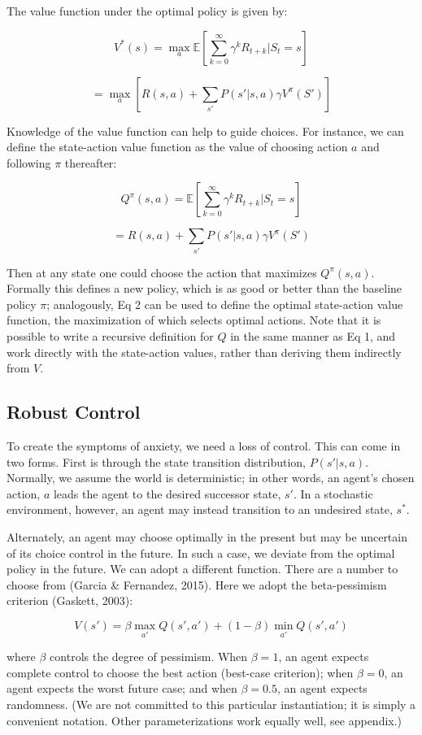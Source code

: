 \documentclass[11pt]{article} %
\begin{document}
The value function under the optimal policy is given by:

$$ V^*(s) = \max_a \mathbb{E} \left[ \sum^{\infty}_{k=0} \gamma^k R_{t+k} | S_t = s \right] $$

$$ = \max_a \left[ R(s,a) + \sum_{s'} P(s'|s,a) \gamma V^\pi (S') \right] $$

Knowledge of the value function can help to guide choices. For instance, we can
define the state-action value function as the value of choosing action $a$ and
following $\pi$ thereafter:

$$ Q^\pi(s,a) = \mathbb{E} \left[ \sum^{\infty}_{k=0} \gamma^k R_{t+k} | S_t = s \right] $$

$$ = R(s,a) + \sum_{s'} P(s'|s,a) \gamma V^\pi (S') $$

Then at any state one could choose the action that maximizes $Q^\pi(s,a)$. Formally
this defines a new policy, which is as good or better than the baseline policy
$\pi$; analogously, Eq 2 can be used to define the optimal state-action value
function, the maximization of which selects optimal actions. Note that it is
possible to write a recursive definition for $Q$ in the same manner as Eq 1, and
work directly with the state-action values, rather than deriving them indirectly
from $V$.

\subsection{Robust Control}

To create the symptoms of anxiety, we need a loss of control. This can come in
two forms. First is through the state transition distribution, $P(s'|s,a)$.
Normally, we assume the world is deterministic; in other words, an agent's chosen
action, $a$ leads the agent to the desired successor state, $s'$. In a stochastic
environment, however, an agent may instead transition to an undesired state, $s^*$.

Alternately, an agent may choose optimally in the present but may be uncertain of
its choice control in the future. In such a case, we deviate from the optimal
policy in the future. We can adopt a different function. There are a number to
choose from (Garcia \& Fernandez, 2015). Here we adopt the beta-pessimism criterion
(Gaskett, 2003):

$$ V(s') = \beta \max_{a'} Q(s',a') + (1 - \beta) \min_{a'} Q(s',a') $$

where $\beta$ controls the degree of pessimism. When $\beta = 1$, an agent expects
complete control to choose the best action (best-case criterion); when $\beta = 0$,
an agent expects the  worst future case; and when $\beta = 0.5$, an agent expects
randomness. (We are not committed to this particular instantiation; it is simply
a convenient notation. Other parameterizations work equally well, see appendix.)
\end{document}
